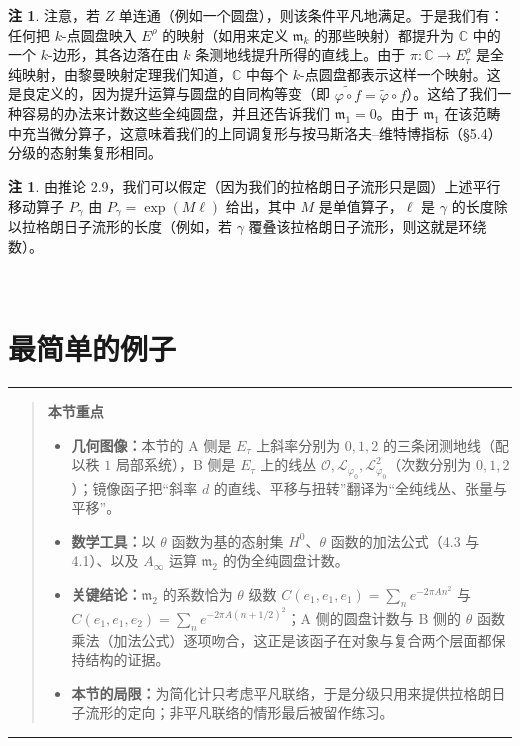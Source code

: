 \documentclass[11pt,a4paper]{article}
\theoremstyle{plain}
\theoremstyle{definition}
\newtheorem{remark}[theorem]{注}
\newenvironment{keytakeaways}[1][本节重点]{%
  \par\addvspace{9pt}%
  \noindent\rule{\linewidth}{0.7pt}\par\nobreak
  \begin{quote}\noindent\textbf{#1}\par\small
}{%
  \end{quote}%
  \noindent\rule{\linewidth}{0.7pt}\par\addvspace{7pt}%
}
\begin{document}
\begin{remark}
注意，若 $Z$ 单连通（例如一个圆盘），则该条件平凡地满足。于是我们有：任何把 $k$-点圆盘映入 $E^\rho$ 的映射（如用来定义 $\mathfrak{m}_k$ 的那些映射）都提升为 $\mathbb{C}$ 中的一个 $k$-边形，其各边落在由 $k$ 条测地线提升所得的直线上。由于 $\pi\colon\mathbb{C}\to E_\tau^\rho$ 是全纯映射，由黎曼映射定理我们知道，$\mathbb{C}$ 中每个 $k$-点圆盘都表示这样一个映射。这是良定义的，因为提升运算与圆盘的自同构等变（即 $\widetilde{\varphi\circ f}=\tilde\varphi\circ f$）。这给了我们一种容易的办法来计数这些全纯圆盘，并且还告诉我们 $\mathfrak{m}_1=0$。由于 $\mathfrak{m}_1$ 在该范畴中充当微分算子，这意味着我们的上同调复形与按马斯洛夫–维特博指标（§5.4）分级的态射集复形相同。
\end{remark}

\begin{remark}
由推论 2.9，我们可以假定（因为我们的拉格朗日子流形只是圆）上述平行移动算子 $P_\gamma$ 由 $P_\gamma=\exp(M\ell)$ 给出，其中 $M$ 是单值算子，$\ell$ 是 $\gamma$ 的长度除以拉格朗日子流形的长度（例如，若 $\gamma$ 覆叠该拉格朗日子流形，则这就是环绕数）。
\end{remark}

﻿\section{最简单的例子}

\begin{keytakeaways}
\begin{itemize}[leftmargin=1.6em,itemsep=1pt,topsep=2pt]
  \item \textbf{几何图像：}本节的 A 侧是 $E_\tau$ 上斜率分别为 $0,1,2$ 的三条闭测地线（配以秩 $1$ 局部系统），B 侧是 $E_\tau$ 上的线丛 $\mathcal{O},\mathcal{L}_{\varphi_0},\mathcal{L}_{\varphi_0}^2$（次数分别为 $0,1,2$）；镜像函子把“斜率 $d$ 的直线、平移与扭转”翻译为“全纯线丛、张量与平移”。
  \item \textbf{数学工具：}以 $\theta$ 函数为基的态射集 $H^0$、$\theta$ 函数的加法公式（4.3 与 4.1）、以及 $A_\infty$ 运算 $\mathfrak{m}_2$ 的伪全纯圆盘计数。
  \item \textbf{关键结论：}$\mathfrak{m}_2$ 的系数恰为 $\theta$ 级数 $C(e_1,e_1,e_1)=\sum_{n}e^{-2\pi An^2}$ 与 $C(e_1,e_1,e_2)=\sum_{n}e^{-2\pi A(n+1/2)^2}$；A 侧的圆盘计数与 B 侧的 $\theta$ 函数乘法（加法公式）逐项吻合，这正是该函子在对象与复合两个层面都保持结构的证据。
  \item \textbf{本节的局限：}为简化计只考虑平凡联络，于是分级只用来提供拉格朗日子流形的定向；非平凡联络的情形最后被留作练习。
\end{itemize}
\end{keytakeaways}
\end{document}
